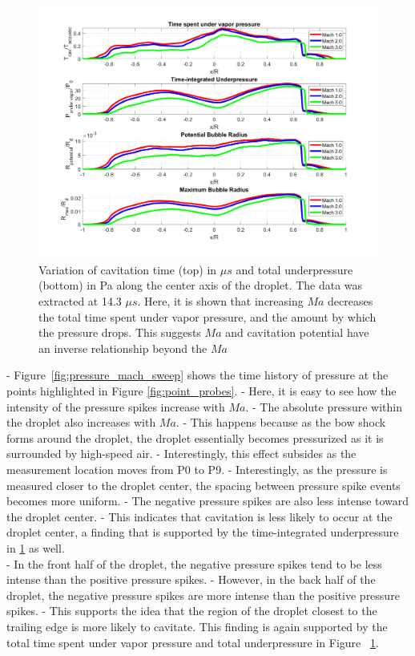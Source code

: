 \documentclass{UCF_ETD}
\begin{document}
\begin{figure}
    \centering
    \includegraphics[width=0.9\linewidth]{Figures/cavitation.png}
    \caption{Variation of cavitation time (top) in $\mu s$ and total underpressure (bottom) in Pa along the center axis of the droplet. The data was extracted at 14.3 $\mu s$. Here, it is shown that increasing $Ma$ decreases the total time spent under vapor pressure, and the amount by which the pressure drops. This suggests $Ma$ and cavitation potential have an inverse relationship beyond the $Ma$}
    \label{fig:cav_time_and_underpressure_centerline}
\end{figure}

- Figure~\ref{fig:pressure_mach_sweep} shows the time history of pressure at the points highlighted in Figure \ref{fig:point_probes}.
- Here, it is easy to see how the intensity of the pressure spikes increase with $Ma$.
- The absolute pressure within the droplet also increases with $Ma$.
- This happens because as the bow shock forms around the droplet, the droplet essentially becomes pressurized as it is surrounded by high-speed air.
- Interestingly, this effect subsides as the measurement location moves from P0 to P9.
- Interestingly, as the pressure is measured closer to the droplet center, the spacing between pressure spike events becomes more uniform.
- The negative pressure spikes are also less intense toward the droplet center.
- This indicates that cavitation is less likely to occur at the droplet center, a finding that is supported by the time-integrated underpressure in \ref{fig:cav_time_and_underpressure_centerline} as well.\\

- In the front half of the droplet, the negative pressure spikes tend to be less intense than the positive pressure spikes.
- However, in the back half of the droplet, the negative pressure spikes are more intense than the positive pressure spikes.
- This supports the idea that the region of the droplet closest to the trailing edge is more likely to cavitate. This finding is again supported by the total time spent under vapor pressure and total underpressure in Figure ~\ref{fig:cav_time_and_underpressure_centerline}.
\end{document}
